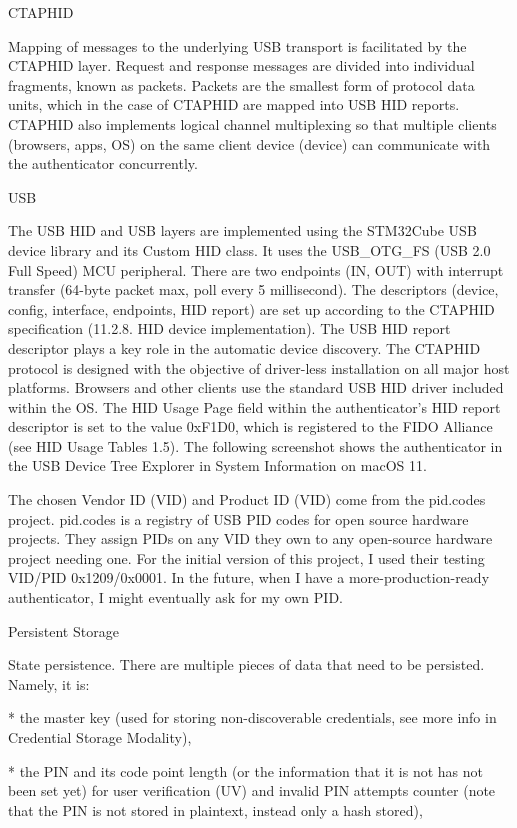 \secc CTAPHID

Mapping of messages to the underlying USB transport is facilitated by the CTAPHID layer. Request and response messages are divided into individual fragments, known as packets. Packets are the smallest form of protocol data units, which in the case of CTAPHID are mapped into USB HID reports. CTAPHID also implements logical channel multiplexing so that multiple clients (browsers, apps, OS) on the same client device (device) can communicate with the authenticator concurrently.


\secc USB

The USB HID and USB layers are implemented using the STM32Cube USB device library and its Custom HID class. It uses the USB_OTG_FS (USB 2.0 Full Speed) MCU peripheral.
There are two endpoints (IN, OUT) with interrupt transfer (64-byte packet max, poll every 5 millisecond). The descriptors (device, config, interface, endpoints, HID report) are set up according to the CTAPHID specification (11.2.8. HID device implementation).
The USB HID report descriptor plays a key role in the automatic device discovery. The CTAPHID protocol is designed with the objective of driver-less installation on all major host platforms. Browsers and other clients use the standard USB HID driver included within the OS. The HID Usage Page field within the authenticator’s HID report descriptor is set to the value 0xF1D0, which is registered to the FIDO Alliance (see HID Usage Tables 1.5).
The following screenshot shows the authenticator in the USB Device Tree Explorer in System Information on macOS 11.

The chosen Vendor ID (VID) and Product ID (VID) come from the pid.codes project.
pid.codes is a registry of USB PID codes for open source hardware projects. They assign PIDs on any VID they own to any open-source hardware project needing one.
For the initial version of this project, I used their testing VID/PID 0x1209/0x0001. In the future, when I have a more-production-ready authenticator, I might eventually ask for my own PID.

\secc Persistent Storage


State persistence. There are multiple pieces of data that need to be persisted. Namely, it is:

\begitems

* the master key (used for storing non-discoverable credentials, see more info in Credential Storage Modality),

* the PIN and its code point length (or the information that it is not has not been set yet) for user verification (UV) and invalid PIN attempts counter (note that the PIN is not stored in plaintext, instead only a hash stored),

